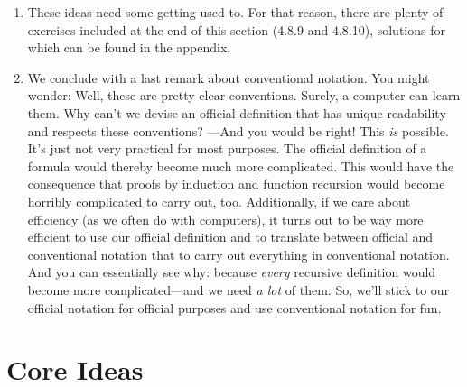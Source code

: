 \begin{enumerate}[\thesection.1]
\begin{itemize}
	\end{itemize}
	
	\item These ideas need some getting used to. For that reason, there are plenty of exercises included at the end of this section (4.8.9 and 4.8.10), solutions for which can be found in the appendix.
	
	\item We conclude with a last remark about conventional notation. You might wonder: Well, these are pretty clear conventions. Surely, a computer can learn them. Why can't we devise an official definition that has unique readability and respects these conventions? ---And you would be right! This \emph{is} possible. It's just not very practical for most purposes. The official definition of a formula would thereby become much more complicated. This would have the consequence that proofs by induction and function recursion would become horribly complicated to carry out, too. Additionally, if we care about efficiency (as we often do with computers), it turns out to be way more efficient to use our official definition and to translate between official and conventional notation that to carry out everything in conventional notation. And you can essentially see why: because \emph{every} recursive definition would become more complicated---and we need \emph{a lot} of them. So, we'll stick to our official notation for official purposes and use conventional notation for fun. 

	\end{enumerate}

\section{Core Ideas}

